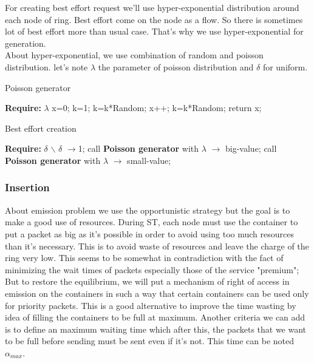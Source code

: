 \documentclass{article}
\begin{document}
For creating best effort request we'll use hyper-exponential distribution around each node of ring. Best effort come on the node as a flow. So there is sometimes lot of best effort more than usual case. That's why we use  hyper-exponential for generation.\\
About  hyper-exponential, we use combination of random  and poisson distribution. let's note $\lambda$ the parameter of poisson distribution and $\delta$ for uniform.

\begin{algorithm}
\caption{Poisson generator}
\begin{algorithmic}
\State \textbf{Require:} $\lambda$
\State x=0; k=1;
\State  k=k*Random;
\State x++;
\State  k=k*Random;
\EndWhile
\State return x;
\end{algorithmic}
\end{algorithm} 

\begin{algorithm}
\caption{Best effort creation}
\begin{algorithmic}
\State \textbf{Require:} $\delta$ $\backslash$ $\delta$ $\rightarrow$1;
\State call \textbf{Poisson generator} with $\lambda$ $\rightarrow$ big-value;
\Else
\State call \textbf{Poisson generator} with $\lambda$ $\rightarrow$ small-value; 
\EndIf
\end{algorithmic}
\end{algorithm}  

\subsubsection{Insertion} 
About emission problem we use the opportunistic strategy but the goal is to make a good use of resources. During ST, each node must use the container to put a packet as big as it's possible in order to avoid using too much resources than it's necessary. This is to avoid waste of resources and leave the charge of the ring very low. This seems to be somewhat in contradiction with the fact of minimizing the wait times of packets especially those of the service "premium"; But to restore the equilibrium, we will put a mechanism of right of access in emission on the containers in such a way that certain containers can be used only for priority packets. This is a good alternative to improve the time wasting by idea of filling the containers to be full at maximum. Another criteria we can add is to define an maximum waiting time which after this, the packets that we want to be full before sending must be sent even if it's not. This time can be noted \textbf{ {$\alpha_{max}$}}.
\end{document}
